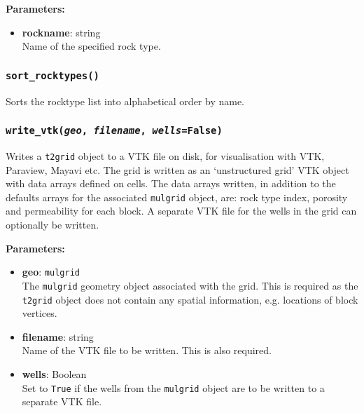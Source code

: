 \textbf{Parameters:}
\begin{itemize}
\item \textbf{rockname}: string\\
  Name of the specified rock type.
\end{itemize}

\begin{snugshade}
\subsubsection{\texttt{sort\_rocktypes()}}
\end{snugshade}
\label{sec:t2grid:sort_rocktypes}

Sorts the rocktype list into alphabetical order by name.

\begin{snugshade}
\subsubsection{\texttt{write\_vtk(\emph{geo}, \emph{filename}, \emph{wells}=False)}}
\end{snugshade}
\label{sec:t2grid:write_vtk}

Writes a \texttt{t2grid} object to a VTK file on disk, for visualisation with VTK, Paraview, Mayavi etc.  The grid is written as an `unstructured grid' VTK object with data arrays defined on cells.  The data arrays written, in addition to the defaults arrays for the associated \texttt{mulgrid} object, are: rock type index, porosity and permeability for each block.  A separate VTK file for the wells in the grid can optionally be written.

\textbf{Parameters:}
\begin{itemize}
\item \textbf{geo}: \texttt{mulgrid}\\
  The \texttt{mulgrid} geometry object associated with the grid.  This is required as the \texttt{t2grid} object does not contain any spatial information, e.g. locations of block vertices.
\item \textbf{filename}: string\\
  Name of the VTK file to be written.  This is also required.
\item \textbf{wells}: Boolean\\
  Set to \texttt{True} if the wells from the \texttt{mulgrid} object are to be written to a separate VTK file.
\end{itemize}

